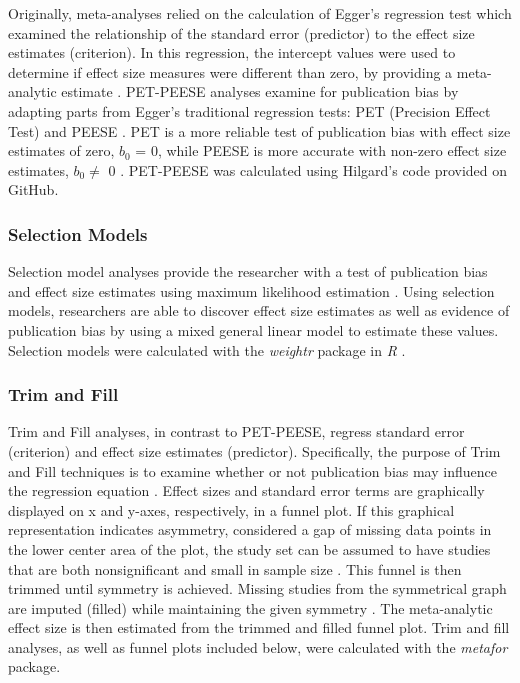 \documentclass[english,man]{apa6}
\theoremstyle{definition}
\theoremstyle{definition}
\theoremstyle{definition}
\theoremstyle{remark}
\begin{document}
Originally, meta-analyses relied on the calculation of Egger's
regression test which examined the relationship of the standard error
(predictor) to the effect size estimates (criterion). In this
regression, the intercept values were used to determine if effect size
measures were different than zero, by providing a meta-analytic estimate
\autocites{Egger1997}{Stanley2005}. PET-PEESE analyses examine for
publication bias by adapting parts from Egger's traditional regression
tests: PET (Precision Effect Test) and PEESE \autocite[Precision Effect
Estimate with Standard Error,][]{Carter2014}. PET is a more reliable
test of publication bias with effect size estimates of zero, \(b_0\) =
0, while PEESE is more accurate with non-zero effect size estimates,
\(b_0 \neq\) 0 \autocite{Stanley2014}. PET-PEESE was calculated using
Hilgard's \autocite*{Hilgard2016} code provided on GitHub.

\subsubsection{Selection Models}\label{selection-models}

Selection model analyses provide the researcher with a test of
publication bias and effect size estimates using maximum likelihood
estimation \autocites{Vevea1995}{Vevea2005}. Using selection models,
researchers are able to discover effect size estimates as well as
evidence of publication bias \autocite{McShane2016} by using a mixed
general linear model to estimate these values. Selection models were
calculated with the \emph{weightr} package in \emph{R}
\autocite{Coburn2017}.

\subsubsection{Trim and Fill}\label{trim-and-fill}

Trim and Fill analyses, in contrast to PET-PEESE, regress standard error
(criterion) and effect size estimates (predictor). Specifically, the
purpose of Trim and Fill techniques is to examine whether or not
publication bias may influence the regression equation
\autocite{Carter2014}. Effect sizes and standard error terms are
graphically displayed on x and y-axes, respectively, in a funnel plot.
If this graphical representation indicates asymmetry, considered a gap
of missing data points in the lower center area of the plot, the study
set can be assumed to have studies that are both nonsignificant and
small in sample size \autocite{VanAssen2015}. This funnel is then
trimmed until symmetry is achieved. Missing studies from the symmetrical
graph are imputed (filled) while maintaining the given symmetry
\autocite{Duval2000}. The meta-analytic effect size is then estimated
from the trimmed and filled funnel plot. Trim and fill analyses, as well
as funnel plots included below, were calculated with the \emph{metafor}
package.
\end{document}
